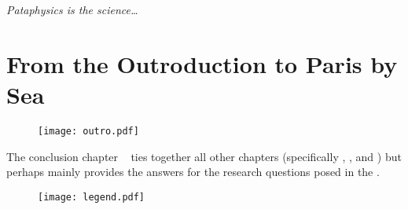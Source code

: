 \emph{Pataphysics is the science\ldots}


\section{From the Outroduction to Paris by Sea}

\begin{figure}[!htb]
\centering
  \texttt{[image: outro.pdf]}
\end{figure}

The conclusion chapter \outro~ ties together all other chapters (specifically \found, \inter, and \imple) but perhaps mainly provides the answers for the research questions posed in the  \intro.

\begin{figure}[!htb]
\centering
  \texttt{[image: legend.pdf]}
\end{figure}

\stopcontents[chapters]
